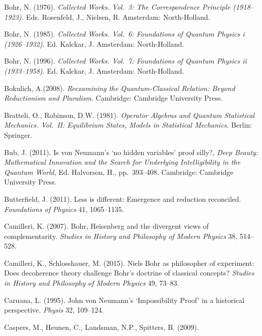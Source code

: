 \documentclass[12pt]{article}
\begin{document}
\begin{footnotesize}
\begin{trivlist}
\item Bohr, N. (1976).   \emph{Collected Works. Vol.\ 3:
The Correspondence Principle (1918--1923).} Eds. Rosenfeld, J., Nielsen, R.  Amsterdam: North-Holland.
\item Bohr, N. (1985). \emph{Collected Works. Vol.\ 6: Foundations of Quantum Physics {\sc i} (1926--1932)}. Ed. Kalckar, J. Amsterdam: North-Holland.
\item Bohr, N. (1996). \emph{Collected Works. Vol.\ 7: Foundations of Quantum Physics {\sc ii} (1933--1958)}. Ed. Kalckar, J.  Amsterdam: North-Holland.
\item Bokulich, A.(2008). \emph{Reexamining the Quantum-Classical Relation: Beyond Reductionism and Pluralism}.
Cambridge: Cambridge University Press. 
\item  Bratteli, O., Robinson, D.W. (1981). \emph{Operator Algebras and Quantum Statistical Mechanics. Vol.\ II:
Equilibrium States, Models in Statistical Mechanics}. Berlin: Springer.
\item  
 Bub, J. (2011). Is von Neumann's `no hidden variables' proof silly?,
 \emph{Deep Beauty: Mathematical Innovation and the Search for Underlying Intelligibility in the Quantum World}, Ed.
  Halvorson, H.,  pp.\ 393--408. Cambridge: Cambridge University Press. 
  \item Butterfield, J. (2011). Less is different: Emergence and reduction reconciled.
\emph{Foundations of Physics} 41, 1065--1135.
\item  Camilleri, K. (2007). Bohr, Heisenberg and the divergent views of complementarity. 
\emph{Studies in History and Philosophy of Modern Physics} 38, 514--528.
\item Camilleri, K., Schlosshauer, M. (2015). Niels Bohr as philosopher of experiment: Does decoherence theory challenge Bohr's doctrine of classical concepts?
\emph{Studies in History and Philosophy of Modern Physics} 49, 73--83. 
\item Caruana, L. (1995). John von Neumann's `Impossibility Proof' in a historical perspective.
\emph{Physis} 32, 109--124.
\item  Caspers, M., Heunen, C., Landsman, N.P., Spitters, B. (2009). 

\end{trivlist}
\end{footnotesize}
\end{document}
